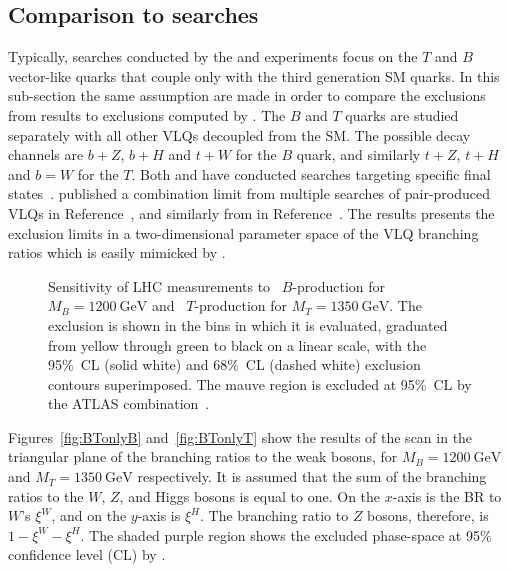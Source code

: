 \subsection{Comparison to \ATLAS searches}
Typically, searches conducted by the \ATLAS and \CMS experiments focus on the $T$ and $B$ vector-like quarks that couple only with the third generation SM quarks. In this sub-section the same assumption are made in order to compare the exclusions from \LHC results to exclusions computed by \contur. The $B$ and $T$ quarks are studied separately with all other VLQs decoupled from the SM. The possible decay channels are $b + Z$, $b + H$ and $t + W$ for the $B$ quark, and similarly $t + Z$, $t + H$ and $b = W$ for the $T$. Both \ATLAS and \CMS have conducted searches targeting specific final states~. \ATLAS published a combination limit from multiple searches of pair-produced VLQs in Reference~\cite{ATLAS_VLQ_combination}, and similarly from \CMS in Reference~\cite{Sirunyan_2018}. The \ATLAS results presents the exclusion limits in a two-dimensional parameter space of the VLQ branching ratios which is easily mimicked by \contur.
\begin{figure}[tbp]
    \vspace{-0.4cm}
    \caption{Sensitivity of LHC measurements to
    \protect{}~$B$-production for $M_B = \SI{1200}{\GeV}$ and
    \protect{}~$T$-production for $M_T = \SI{1350}{\GeV}$.
    The \contur exclusion is shown in the bins in which it is evaluated,
    graduated from yellow through green to black on a linear scale, with the 95\%~CL (solid white)
    and 68\%~CL (dashed white) exclusion contours superimposed. The mauve region
    is excluded at 95\%~CL by the ATLAS combination~\cite{Aaboud:2018pii}.}
    \label{fig:BTonly}
\end{figure}

Figures~\ref{fig:BTonlyB} and~\ref{fig:BTonlyT} show the results of the \contur scan in the triangular plane of the branching ratios to the weak bosons, for $M_B = \SI{1200}{\GeV}$ and $M_T = \SI{1350}{\GeV}$ respectively. It is assumed that the sum of the branching ratios to the $W$, $Z$, and Higgs bosons is equal to one. On the $x$-axis is the BR to $W$'s $\xi^W$, and on the $y$-axis is $\xi^H$. The branching ratio to $Z$ bosons, therefore, is $1-\xi^W-\xi^H$. The shaded purple region shows the excluded phase-space at 95\% confidence level (CL) by \ATLAS. 

